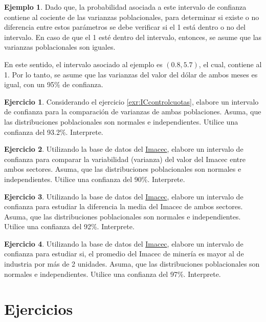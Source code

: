 \documentclass[
  11pt,
]{book}
\theoremstyle{definition}
\theoremstyle{definition}
\newtheorem{example}{Ejemplo}[chapter]
\theoremstyle{definition}
\newtheorem{exercise}{Ejercicio}[chapter]
\theoremstyle{definition}
\theoremstyle{remark}
\begin{document}
\begin{example}
Dado que, la probabilidad asociada a este intervalo de confianza contiene al cociente de las varianzas poblacionales, para determinar si existe o no diferencia entre estos parámetros se debe verificar si el 1 está dentro o no del intervalo. En caso de que el 1 esté dentro del intervalo, entonces, se asume que las varianzas poblacionales son iguales.

En este sentido, el intervalo asociado al ejemplo es \((0.8, 5.7)\), el cual, contiene al 1. Por lo tanto, se asume que las varianzas del valor del dólar de ambos meses es igual, con un 95\% de confianza.
\end{example}

\begin{exercise}
Considerando el ejercicio \ref{exr:ICcontrolcuotas}, elabore un intervalo de confianza para la comparación de varianzas de ambas poblaciones. Asuma, que las distribuciones poblacionales son normales e independientes. Utilice una confianza del 93.2\%. Interprete.
\end{exercise}

\begin{exercise}
Utilizando la base de datos del \hyperref[Imacec]{Imacec}, elabore un intervalo de confianza para comparar la variabilidad (varianza) del valor del Imacec entre ambos sectores. Asuma, que las distribuciones poblacionales son normales e independientes. Utilice una confianza del 90\%. Interprete.
\end{exercise}

\begin{exercise}
Utilizando la base de datos del \hyperref[Imacec]{Imacec}, elabore un intervalo de confianza para estudiar la diferencia la media del Imacec de ambos sectores. Asuma, que las distribuciones poblacionales son normales e independientes. Utilice una confianza del 92\%. Interprete.
\end{exercise}

\begin{exercise}
Utilizando la base de datos del \hyperref[Imacec]{Imacec}, elabore un intervalo de confianza para estudiar si, el promedio del Imacec de minería es mayor al de industria por más de 2 unidades. Asuma, que las distribuciones poblacionales son normales e independientes. Utilice una confianza del 97\%. Interprete.
\end{exercise}

\section{Ejercicios}\label{ejercicios-unidad1}
\end{document}
